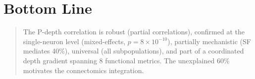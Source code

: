 \documentclass[11pt,letterpaper]{article}
\begin{document}
\section*{Bottom Line}

\begin{quote}
The P-depth correlation is robust (partial correlations), confirmed at
the single-neuron level (mixed-effects, $p = 8 \times 10^{-10}$),
partially mechanistic (SF mediates 40\%), universal (all subpopulations),
and part of a coordinated depth gradient spanning 8 functional metrics.
The unexplained 60\% motivates the connectomics integration.
\end{quote}
\end{document}
